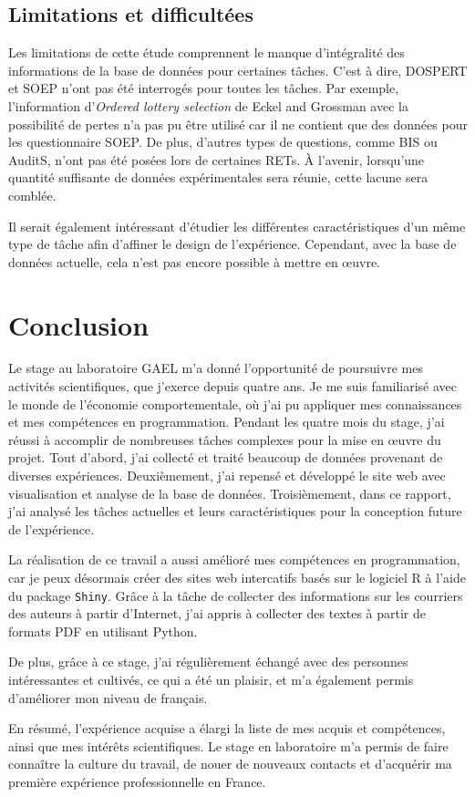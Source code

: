 \documentclass[12pt]{article}
\begin{document}
\subsection{Limitations et difficultées}

Les limitations de cette étude comprennent le manque d'intégralité des
informations de la base de données pour certaines tâches. C'est à dire,
DOSPERT et SOEP n'ont pas été interrogés pour toutes les tâches. Par
exemple, l'information d'\emph{Ordered lottery selection} de Eckel and
Grossman avec la possibilité de pertes n'a pas pu être utilisé car il ne
contient que des données pour les questionnaire SOEP. De plus, d'autres
types de questions, comme BIS ou AuditS, n'ont pas été posées lors de
certaines RETs. À l'avenir, lorsqu'une quantité suffisante de données
expérimentales sera réunie, cette lacune sera comblée.

Il serait également intéressant d'étudier les différentes
caractéristiques d'un même type de tâche afin d'affiner le design de
l'expérience. Cependant, avec la base de données actuelle, cela n'est
pas encore possible à mettre en œuvre.

\section{Conclusion}

Le stage au laboratoire GAEL m'a donné l'opportunité de poursuivre mes
activités scientifiques, que j'exerce depuis quatre ans. Je me suis
familiarisé avec le monde de l'économie comportementale, où j'ai pu
appliquer mes connaissances et mes compétences en programmation. Pendant
les quatre mois du stage, j'ai réussi à accomplir de nombreuses tâches
complexes pour la mise en œuvre du projet. Tout d'abord, j'ai collecté
et traité beaucoup de données provenant de diverses expériences.
Deuxièmement, j'ai repensé et développé le site web avec visualisation
et analyse de la base de données. Troisièmement, dans ce rapport, j'ai
analysé les tâches actuelles et leurs caractéristiques pour la
conception future de l'expérience.

La réalisation de ce travail a aussi amélioré mes compétences en
programmation, car je peux désormais créer des sites web intercatifs
basés sur le logiciel R à l'aide du package \texttt{Shiny}. Grâce à la
tâche de collecter des informations sur les courriers des auteurs à
partir d'Internet, j'ai appris à collecter des textes à partir de
formats PDF en utilisant Python.

De plus, grâce à ce stage, j'ai régulièrement échangé avec des personnes
intéressantes et cultivés, ce qui a été un plaisir, et m'a également
permis d'améliorer mon niveau de français.

En résumé, l'expérience acquise a élargi la liste de mes acquis et
compétences, ainsi que mes intérêts scientifiques. Le stage en
laboratoire m'a permis de faire connaître la culture du travail, de
nouer de nouveaux contacts et d'acquérir ma première expérience
professionnelle en France.



\end{document}
